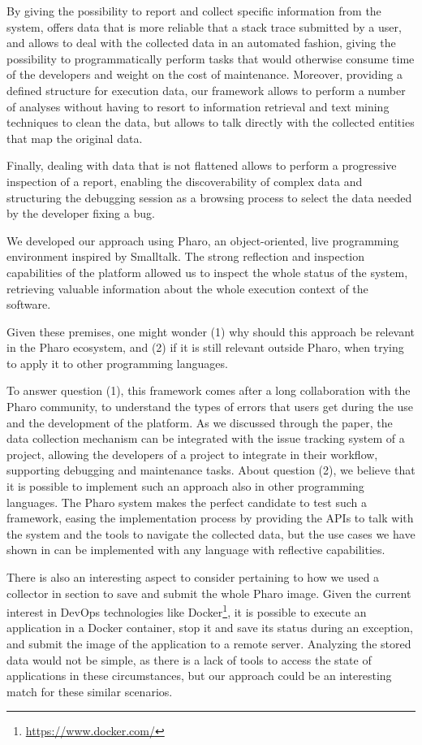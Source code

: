 By giving the possibility to report and collect specific information from the system, \sln offers data that is more reliable that a stack trace submitted by a user, and allows to deal with the collected data in an automated fashion, giving the possibility to programmatically perform tasks that would otherwise consume time of the developers and weight on the cost of maintenance.
Moreover, providing a defined structure for execution data, our framework allows to perform a number of analyses without having to resort to information retrieval and text mining techniques to clean the data, but allows to talk directly with the collected entities that map the original data.

Finally, dealing with data that is not flattened allows to perform a progressive inspection of a report, enabling the discoverability of complex data and structuring the debugging session as a browsing process to select the data needed by the developer fixing a bug.


 We developed our approach using Pharo, an object-oriented, live programming environment inspired by Smalltalk.
The strong reflection and inspection capabilities of the platform allowed us to inspect the whole status of the system, retrieving valuable information about the whole execution context of the software.

Given these premises, one might wonder (1) why should this approach be relevant in the Pharo ecosystem, and (2) if it is still relevant outside Pharo, when trying to apply it to other programming languages.

To answer question (1), this framework comes after a long collaboration with the Pharo community, to understand the types of errors that users get during the use and the development of the platform.
As we discussed through the paper, the data collection mechanism can be integrated with the issue tracking system of a project, allowing the developers of a project to integrate \sln in their workflow, supporting debugging and maintenance tasks. About question (2), we believe that it is possible to implement such an approach also in other programming languages.
The Pharo system makes the perfect candidate to test such a framework, easing the implementation process by providing the APIs to talk with the system and the tools to navigate the collected data, but the use cases we have shown in  can be implemented with any language with reflective capabilities.

There is also an interesting aspect to consider pertaining to how we used a collector in section  to save and submit the whole Pharo image.
Given the current interest in DevOps technologies like Docker\footnote{\url{https://www.docker.com/}}, it is possible to execute an application in a Docker container, stop it and save its status during an exception, and submit the image of the application to a remote server.
Analyzing the stored data would not be simple, as there is a lack of tools to access the state of applications in these circumstances, but our approach could be an interesting match for these similar scenarios.

